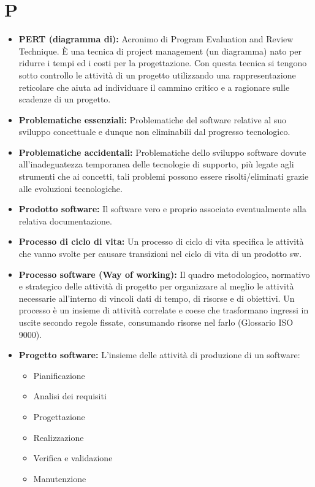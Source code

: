\documentclass[a4paper]{article}
\begin{document}
	\section*{P}
		\begin{itemize}
			\item \textbf{PERT (diagramma di):} Acronimo di Program Evaluation and Review Technique. È una tecnica di project management 
			(un diagramma) nato per ridurre i tempi ed i costi per la progettazione. Con questa tecnica si tengono sotto 
			controllo le attività di un progetto utilizzando una rappresentazione reticolare che aiuta ad individuare il 
			cammino critico e a ragionare sulle scadenze di un progetto.
			\item \textbf{Problematiche essenziali:} Problematiche del software relative al suo sviluppo concettuale e dunque 
			non eliminabili dal progresso tecnologico.
			\item \textbf{Problematiche accidentali:} Problematiche dello sviluppo software dovute all’inadeguatezza temporanea 
			delle tecnologie di supporto, più legate agli strumenti che ai concetti, tali problemi possono essere risolti/eliminati 
			grazie alle evoluzioni tecnologiche.
			\item \textbf{Prodotto software:} Il software vero e proprio associato eventualmente alla relativa documentazione.
			\item \textbf{Processo di ciclo di vita:} Un processo di ciclo di vita specifica le attività che vanno svolte per 
			causare transizioni nel ciclo di vita di un prodotto sw.
			\item \textbf{Processo software (Way of working):} Il quadro metodologico, normativo e strategico delle attività di 
			progetto per organizzare al meglio le attività necessarie all’interno di vincoli dati di tempo, di risorse e di obiettivi. 
			Un processo è un insieme di attività correlate e coese che trasformano ingressi in uscite secondo regole fissate, consumando 
			risorse nel farlo (Glossario ISO 9000).
			\item \textbf{Progetto software:} L’insieme delle attività di produzione di un software:
			\begin{itemize}
				\item  Pianificazione
			  	\item  Analisi dei requisiti
			  	\item  Progettazione
			  	\item  Realizzazione
			  	\item  Verifica e validazione
			  	\item  Manutenzione

\end{itemize}
\end{itemize}
\end{document}

